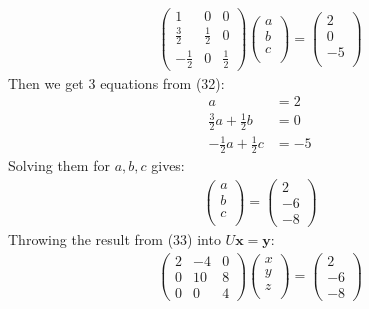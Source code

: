 \documentclass[12pt]{article}
\begin{document}
\begin{align}
\left(\begin{array}{ccc}
1 & 0 & 0 \\
\frac{3}{2} & \frac{1}{2} & 0 \\
-\frac{1}{2} & 0 & \frac{1}{2}
\end{array}\right) 
\left(\begin{array}{c}
a\\
b\\
c\\
\end{array}\right)
=
\left(\begin{array}{c}
2\\
0\\
-5\\
\end{array}\right)
\end{align}
Then we get 3 equations from (32):
\begin{align*}
a&=2\\
\frac{3}{2}a+\frac{1}{2}b&=0\\
-\frac{1}{2}a+\frac{1}{2}c&=-5
\end{align*}
Solving them for $a,b,c$ gives:
\begin{align}
\left(\begin{array}{c}
a\\
b\\
c\\
\end{array}\right)
=
\left(\begin{array}{c}
2\\
-6\\
-8
\end{array}\right)
\end{align}
Throwing the result from (33) into $U\textbf{x}=\textbf{y}$:
\begin{align}
\left(\begin{array}{ccc}
2 & -4 & 0 \\
0 & 10 & 8 \\
0 & 0 & 4
\end{array}\right)
\left(\begin{array}{c}
x\\
y\\
z\\
\end{array}\right)
=
\left(\begin{array}{c}
2\\
-6\\
-8
\end{array}\right)
\end{align}
\end{document}

